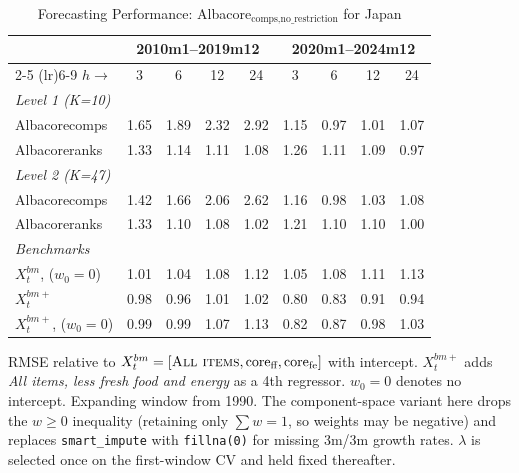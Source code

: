 \begin{table}[htbp]
\centering
\caption{Forecasting Performance: Albacore$_{\text{comps,no\_restriction}}$ for Japan}
\label{tab:horizon_table_no_restriction}
\begin{tabular}{lcccccccc}
\toprule
 & \multicolumn{4}{c}{2010m1--2019m12} & \multicolumn{4}{c}{2020m1--2024m12} \\
\cmidrule(lr){2-5} \cmidrule(lr){6-9}
$h \to$ & 3 & 6 & 12 & 24 & 3 & 6 & 12 & 24 \\
\midrule
\multicolumn{9}{l}{\textit{Level 1 (K=10)}} \\
Albacorecomps & 1.65 & 1.89 & 2.32 & 2.92 & 1.15 & 0.97 & 1.01 & 1.07 \\
Albacoreranks & 1.33 & 1.14 & 1.11 & 1.08 & 1.26 & 1.11 & 1.09 & 0.97 \\
\multicolumn{9}{l}{\textit{Level 2 (K=47)}} \\
Albacorecomps & 1.42 & 1.66 & 2.06 & 2.62 & 1.16 & 0.98 & 1.03 & 1.08 \\
Albacoreranks & 1.33 & 1.10 & 1.08 & 1.02 & 1.21 & 1.10 & 1.10 & 1.00 \\
\multicolumn{9}{l}{\textit{Benchmarks}} \\
$X^{bm}_t$, ($w_0{=}0$) & 1.01 & 1.04 & 1.08 & 1.12 & 1.05 & 1.08 & 1.11 & 1.13 \\
$X^{bm+}_t$ & 0.98 & 0.96 & 1.01 & 1.02 & 0.80 & 0.83 & 0.91 & 0.94 \\
$X^{bm+}_t$, ($w_0{=}0$) & 0.99 & 0.99 & 1.07 & 1.13 & 0.82 & 0.87 & 0.98 & 1.03 \\
\bottomrule
\end{tabular}
\begin{tablenotes}\footnotesize\item RMSE relative to $X^{bm}_t = [\textsc{All items}, \text{core}_{\text{ff}}, \text{core}_{\text{fe}}]$ with intercept. $X^{bm+}_t$ adds \textit{All items, less fresh food and energy} as a 4th regressor. $w_0{=}0$ denotes no intercept. Expanding window from 1990. The component-space variant here drops the $w \ge 0$ inequality (retaining only $\sum w = 1$, so weights may be negative) and replaces \texttt{smart\_impute} with \texttt{fillna(0)} for missing 3m/3m growth rates. $\lambda$ is selected once on the first-window CV and held fixed thereafter.\end{tablenotes}
\end{table}
